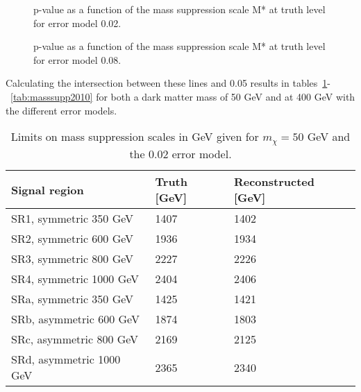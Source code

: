  \begin{figure}[H] %
    \hfill
    \caption{p-value as a function of the mass suppression scale M* at truth level for error model 0.02.}
    \label{fig:SRnewMt}
  \end{figure}
\newpage
 \begin{figure}[H] %
    \hfill
    \caption{p-value as a function of the mass suppression scale M* at truth level for error model 0.08.}
    \label{fig:SRnewMr}
  \end{figure}

Calculating the intersection between these lines and 0.05 results in tables~\ref{tab:masssupp002}-~\ref{tab:masssupp2010} for both a dark matter mass of 50 GeV and at 400 GeV with the different error models.

\begin{table}[ht]
\begin{center}
\begin{tabular}{|l|l|l|}
\hline
Signal region & Truth [GeV]& Reconstructed [GeV]\\ \hline
SR1, symmetric 350 GeV &1407&1402\\
SR2, symmetric 600 GeV&1936&1934\\
SR3, symmetric 800 GeV&2227&2226\\
SR4, symmetric 1000 GeV&2404&2406\\ \hline
SRa, symmetric 350 GeV &1425&1421\\
SRb, asymmetric 600 GeV &1874&1803\\
SRc, asymmetric 800 GeV&2169&2125\\
SRd, asymmetric 1000 GeV&2365&2340\\ \hline
\end{tabular}
\caption{Limits on mass suppression scales in GeV given for $m_{\chi}=50$ GeV and the 0.02 error model.}
\label{tab:masssupp002}
\end{center}
\end{table}

